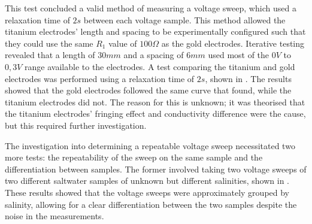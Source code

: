 This test concluded a valid method of measuring a voltage sweep, which used a relaxation time of $2s$ between each voltage sample.
This method allowed the titanium electrodes' length and spacing to be experimentally configured such that they could use the same $R_1$ value of $100\Omega$ as the gold electrodes.
Iterative testing revealed that a length of $30mm$ and a spacing of $6mm$ used most of the $0V$ to $0,3V$ range available to the electrodes.
A test comparing the titanium and gold electrodes was performed using a relaxation time of $2s$, shown in .
The results showed that the gold electrodes followed the same curve that  found, while the titanium electrodes did not.
The reason for this is unknown; it was theorised that the titanium electrodes' fringing effect and conductivity difference were the cause, but this required further investigation.

The investigation into determining a repeatable voltage sweep necessitated two more tests: the repeatability of the sweep on the same sample and the differentiation between samples.
The former involved taking two voltage sweeps of two different saltwater samples of unknown but different salinities, shown in .
These results showed that the voltage sweeps were approximately grouped by salinity, allowing for a clear differentiation between the two samples despite the noise in the measurements.

